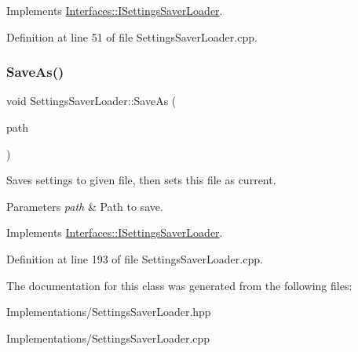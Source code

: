 Implements \hyperlink{class_interfaces_1_1_i_settings_saver_loader_a4d8bdb2c5a27b5b0aa5ee4e55483f0de}{Interfaces\+::\+I\+Settings\+Saver\+Loader}.



Definition at line 51 of file Settings\+Saver\+Loader.\+cpp.

\mbox{\label{class_settings_saver_loader_a67b93496f8b0a0a779d783e967d93572}} 
\subsubsection{\texorpdfstring{Save\+As()}{SaveAs()}}
{\footnotesize\ttfamily void Settings\+Saver\+Loader\+::\+Save\+As (\begin{DoxyParamCaption}\item[{Q\+String}]{path }\end{DoxyParamCaption})\hspace{0.3cm}{\ttfamily [virtual]}}



Saves settings to given file, then sets this file as current. 


\begin{DoxyParams}{Parameters}
{\em path} & Path to save. \\
\hline
\end{DoxyParams}


Implements \hyperlink{class_interfaces_1_1_i_settings_saver_loader_a2d6a6dd6e5b6fe15e8b78af2e75725fc}{Interfaces\+::\+I\+Settings\+Saver\+Loader}.



Definition at line 193 of file Settings\+Saver\+Loader.\+cpp.



The documentation for this class was generated from the following files\+:\begin{DoxyCompactItemize}
\item 
Implementations/Settings\+Saver\+Loader.\+hpp\item 
Implementations/Settings\+Saver\+Loader.\+cpp\end{DoxyCompactItemize}
